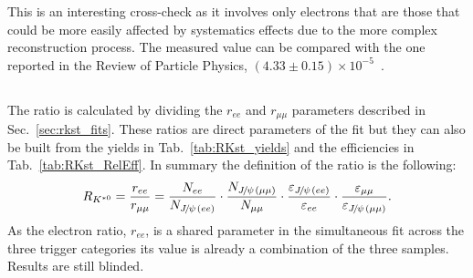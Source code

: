 This is an interesting cross-check as it involves only electrons that are those 
that could be more easily affected by systematics effects due to the more complex reconstruction process.
The measured value can be compared with the one reported in the Review of Particle Physics, $(4.33 \pm 0.15) \times 10^{-5}$~\cite{PDG2014}.

%
%

\subsection{\RKst}

The ratio \RKst is calculated by dividing the $r_{ee}$ and $r_{\mu\mu}$
parameters described in Sec.~\ref{sec:rkst_fits}. These ratios are 
direct parameters of the fit but they can also be built from the yields
in Tab.~\ref{tab:RKst_yields} and the efficiencies in Tab.~\ref{tab:RKst_RelEff}.
In summary the definition of the \RKst ratio is the following:
%
\begin{equation}
\RKst = \frac{r_{ee}}{r_{\mu\mu}}  
= \frac{N_{ee}}{N_{\jpsi(ee)}} 
\cdot \frac{N_{\jpsi(\mu\mu)}}{N_{\mu\mu}}
\cdot \frac{\varepsilon_{\jpsi(ee)}}{\varepsilon_{ee}} 
\cdot \frac{\varepsilon_{\mu\mu}}{\varepsilon_{\jpsi(\mu\mu)}}.
\end{equation}
%
As the electron ratio, $r_{ee}$, is a shared parameter in the simultaneous fit across the
three trigger categories its value is already a combination of the three samples.
Results are still blinded.




